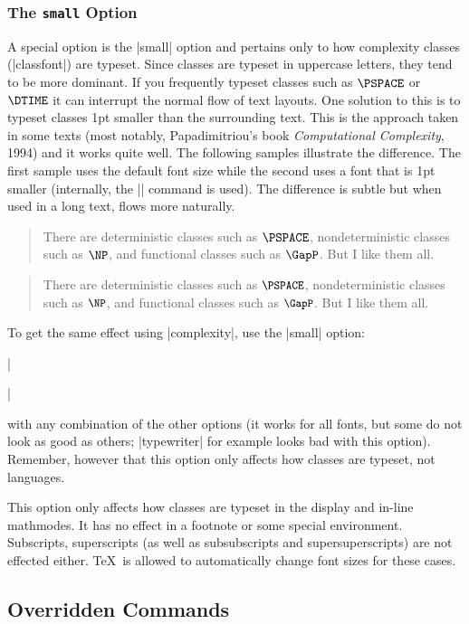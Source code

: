 \documentclass{ltxdoc}
\begin{document}
\subsubsection{The \texttt{small} Option}

A special option is the |small| option and pertains only to how
complexity classes (|classfont|) are typeset.  Since classes are
typeset in uppercase letters, they tend to be more dominant.  If
you frequently typeset classes such as $\PSPACE$ or $\DTIME$ it can
interrupt the normal flow of text layouts. One solution to this is
to typeset classes 1pt smaller than the surrounding text.  This is
the approach taken in some texts (most notably, Papadimitriou's book
\emph{Computational Complexity}, 1994) and it works quite well.
The following samples illustrate the difference.  The first sample
uses the default font size while the second uses a font that is 1pt
smaller (internally, the |\small| command is used).  The difference is
subtle but when used in a long text, flows more naturally.

\begin{quote}
There are deterministic classes such as $\PSPACE$, nondeterministic
classes such as $\NP$, and functional classes such as $\GapP$. But
I like them all.
\end{quote}

\begin{quote}
There are deterministic classes such as $\hbox{\small\PSPACE}$,
nondeterministic classes such as $\hbox{\small \NP}$, and functional
classes such as $\hbox{\small \GapP}$. But I like them all.
\end{quote}

To get the same effect using |complexity|, use the |small|
option:

|\usepackage[small]{complexity}|

with any combination of the other options (it works for all
fonts, but some do not look as good as others; |typewriter|
for example looks bad with this option). Remember, however
that this option only affects how classes are typeset, not
languages.

This option only affects how classes are
typeset in the display and in-line mathmodes.  It has no effect in
a footnote or some special environment. Subscripts,
superscripts (as well as subsubscripts and supersuperscripts) are
not effected either.  \TeX\ is allowed to automatically change font
sizes for these cases.

\subsection{Overridden Commands}
\end{document}
